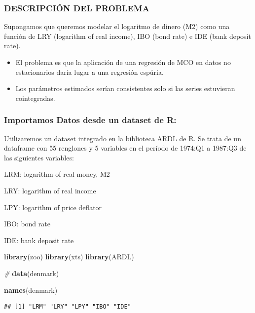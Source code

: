 \documentclass[
]{book}
\newenvironment{Shaded}{\begin{snugshade}}{\end{snugshade}}
\newcommand{\CommentTok}[1]{\textcolor[rgb]{0.56,0.35,0.01}{\textit{#1}}}
\newcommand{\FunctionTok}[1]{\textcolor[rgb]{0.13,0.29,0.53}{\textbf{#1}}}
\newcommand{\NormalTok}[1]{#1}
\begin{document}
\hypertarget{descripciuxf3n-del-problema}{%
\subsubsection{DESCRIPCIÓN DEL PROBLEMA}\label{descripciuxf3n-del-problema}}

Supongamos que queremos modelar el logaritmo de dinero (M2) como una
función de LRY (logarithm of real income), IBO (bond rate) e IDE (bank
deposit rate).

\begin{itemize}
\item
  El problema es que la aplicación de una regresión de MCO en datos no
  estacionarios daría lugar a una regresión espúria.
\item
  Los parámetros estimados serían consistentes solo si las series
  estuvieran cointegradas.
\end{itemize}

\hypertarget{importamos-datos-desde-un-dataset-de-r}{%
\subsubsection{Importamos Datos desde un dataset de R:}\label{importamos-datos-desde-un-dataset-de-r}}

Utilizaremos un dataset integrado en la biblioteca ARDL de R. Se trata
de un dataframe con 55 renglones y 5 variables en el período de 1974:Q1
a 1987:Q3 de las siguientes variables:

LRM: logarithm of real money, M2

LRY: logarithm of real income

LPY: logarithm of price deflator

IBO: bond rate

IDE: bank deposit rate

\begin{Shaded}
\begin{Highlighting}[]
\FunctionTok{library}\NormalTok{(zoo) }
\FunctionTok{library}\NormalTok{(xts) }
\FunctionTok{library}\NormalTok{(ARDL)}

\CommentTok{\#}
\FunctionTok{data}\NormalTok{(denmark)}

\FunctionTok{names}\NormalTok{(denmark)}
\end{Highlighting}
\end{Shaded}

\begin{verbatim}
## [1] "LRM" "LRY" "LPY" "IBO" "IDE"
\end{verbatim}
\end{document}
